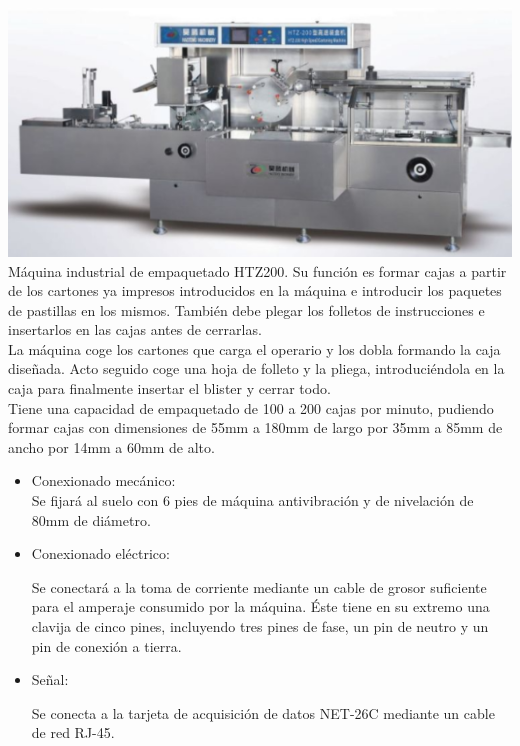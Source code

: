 	\includegraphics[scale=0.6]{Datasheets/7Foto.png}
	\\	

	Máquina industrial de empaquetado HTZ200. Su función es formar cajas a partir de los cartones ya impresos introducidos en la máquina e introducir los paquetes de pastillas en los mismos. También debe plegar los folletos de instrucciones e insertarlos en las cajas antes de cerrarlas. \\

	La máquina coge los cartones que carga el operario y los dobla formando la caja diseñada. Acto seguido coge una hoja de folleto y la pliega, introduciéndola en la caja para finalmente insertar el blister y cerrar todo.\\

	Tiene una capacidad de empaquetado de 100 a 200 cajas por minuto, pudiendo formar cajas con dimensiones de 55mm a 180mm de largo por 35mm a 85mm de ancho por 14mm a 60mm de alto.


		\begin{itemize}
				\item{Conexionado mecánico:}\\
				
				Se fijará al suelo con 6 pies de máquina antivibración y de nivelación de 80mm de diámetro.

				\item{Conexionado eléctrico:}

				Se conectará a la toma de corriente mediante un cable de grosor suficiente para el amperaje consumido por la máquina. Éste tiene en su extremo una clavija de cinco pines, incluyendo tres pines de fase, un pin de neutro y un pin de conexión a tierra.  
				
				\item{Señal:}

				Se conecta a la tarjeta de acquisición de datos NET-26C mediante un cable de red RJ-45.
		\end{itemize}


